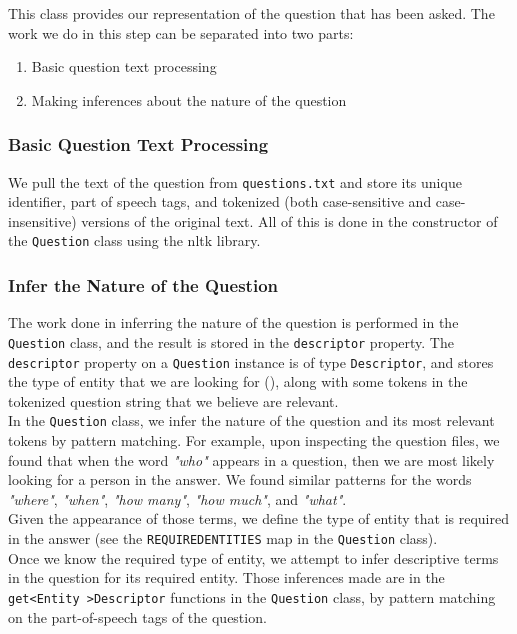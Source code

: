 \documentclass{article}
\begin{document}
This class provides our representation of the question that has been asked. The work we do in this step can be separated into two parts:
\begin{enumerate}
\item Basic question text processing
\item Making inferences about the nature of the question
\end{enumerate}

\subsubsection{Basic Question Text Processing}
We pull the text of the question from \texttt{questions.txt} and store its unique identifier, part of speech tags, and tokenized (both case-sensitive and case-insensitive) versions of the original text. All of this is done in the constructor of the \texttt{Question} class using the nltk library.

\subsubsection{Infer the Nature of the Question}
The work done in inferring the nature of the question is performed in the \texttt{Question} class, and the result is stored in the \texttt{descriptor} property. The \texttt{descriptor} property on a \texttt{Question} instance is of type \texttt{Descriptor}, and stores the type of entity that we are looking for (), along with some tokens in the tokenized question string that we believe are relevant.\\

In the \texttt{Question} class, we infer the nature of the question and its most relevant tokens by pattern matching. For example, upon inspecting the question files, we found that when the word \textit{"who"} appears in a question, then we are most likely looking for a person in the answer. We found similar patterns for the words \textit{"where"},  \textit{"when"},  \textit{"how many"},  \textit{"how much"}, and  \textit{"what"}.\\

Given the appearance of those terms, we define the type of entity that is required in the answer (see the \texttt{REQUIREDENTITIES} map in the \texttt{Question} class).\\

Once we know the required type of entity, we attempt to infer descriptive terms in the question for its required entity. Those inferences made are in the \texttt{get\textless Entity \textgreater Descriptor} functions in the \texttt{Question} class, by pattern matching on the part-of-speech tags of the question.\\
\end{document}
